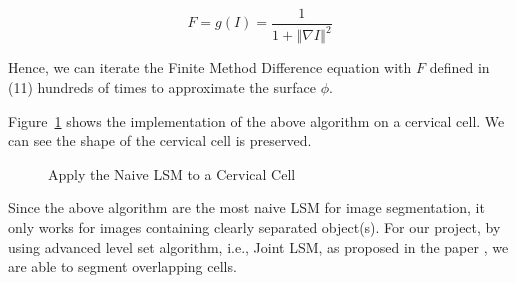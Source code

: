 \documentclass[12pt, letter]{article}
\begin{document}
\begin{equation}
    F = g(I) = \frac{1}{1 + \left\Vert \nabla I \right\Vert^2}
\end{equation}

Hence, we can iterate the Finite Method Difference equation with $F$ defined in (11) hundreds of times to approximate the surface $\phi$. 

Figure~\ref{fig:lsm_demo} shows the implementation of the above algorithm on a cervical cell. We can see the shape of the cervical cell is preserved.

\begin{figure}%
    \centering
    \qquad
    \caption{Apply the Naive LSM to a Cervical Cell}%
    \label{fig:lsm_demo}%
\end{figure}

Since the above algorithm are the most naive LSM for image segmentation, it only works for images containing clearly separated object(s). For our project, by using advanced level set algorithm,  i.e., Joint LSM, as proposed in the paper \cite{main}, we are able to segment overlapping cells. 
\end{document}

